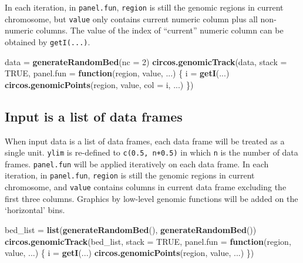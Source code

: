 \documentclass[]{book}
\newenvironment{Shaded}{\begin{snugshade}}{\end{snugshade}}
\newcommand{\KeywordTok}[1]{\textcolor[rgb]{0.13,0.29,0.53}{\textbf{#1}}}
\newcommand{\DataTypeTok}[1]{\textcolor[rgb]{0.13,0.29,0.53}{#1}}
\newcommand{\DecValTok}[1]{\textcolor[rgb]{0.00,0.00,0.81}{#1}}
\newcommand{\StringTok}[1]{\textcolor[rgb]{0.31,0.60,0.02}{#1}}
\newcommand{\OtherTok}[1]{\textcolor[rgb]{0.56,0.35,0.01}{#1}}
\newcommand{\ControlFlowTok}[1]{\textcolor[rgb]{0.13,0.29,0.53}{\textbf{#1}}}
\newcommand{\NormalTok}[1]{#1}
\theoremstyle{definition}
\theoremstyle{definition}
\theoremstyle{remark}
\begin{document}
In each iteration, in \texttt{panel.fun}, \texttt{region} is still the
genomic regions in current chromosome, but \texttt{value} only contains
current numeric column plus all non-numeric columns. The value of the
index of ``current'' numeric column can be obtained by
\texttt{getI(...)}.

\begin{Shaded}
\begin{Highlighting}[]
\NormalTok{data =}\StringTok{ }\KeywordTok{generateRandomBed}\NormalTok{(}\DataTypeTok{nc =} \DecValTok{2}\NormalTok{)}
\KeywordTok{circos.genomicTrack}\NormalTok{(data, }\DataTypeTok{stack =} \OtherTok{TRUE}\NormalTok{,}
    \DataTypeTok{panel.fun =} \ControlFlowTok{function}\NormalTok{(region, value, ...) \{}
\NormalTok{        i =}\StringTok{ }\KeywordTok{getI}\NormalTok{(...)}
        \KeywordTok{circos.genomicPoints}\NormalTok{(region, value, }\DataTypeTok{col =}\NormalTok{ i, ...)}
\NormalTok{\})}
\end{Highlighting}
\end{Shaded}

\subsection{Input is a list of data
frames}\label{input-is-a-list-of-data-frames-1}

When input data is a list of data frames, each data frame will be
treated as a single unit. \texttt{ylim} is re-defined to
\texttt{c(0.5,\ n+0.5)} in which \texttt{n} is the number of data
frames. \texttt{panel.fun} will be applied iteratively on each data
frame. In each iteration, in \texttt{panel.fun}, \texttt{region} is
still the genomic regions in current chromosome, and \texttt{value}
contains columns in current data frame excluding the first three
columns. Graphics by low-level genomic functions will be added on the
`horizontal' bins.

\begin{Shaded}
\begin{Highlighting}[]
\NormalTok{bed_list =}\StringTok{ }\KeywordTok{list}\NormalTok{(}\KeywordTok{generateRandomBed}\NormalTok{(), }\KeywordTok{generateRandomBed}\NormalTok{())}
\KeywordTok{circos.genomicTrack}\NormalTok{(bed_list, }\DataTypeTok{stack =} \OtherTok{TRUE}\NormalTok{,}
    \DataTypeTok{panel.fun =} \ControlFlowTok{function}\NormalTok{(region, value, ...) \{}
\NormalTok{        i =}\StringTok{ }\KeywordTok{getI}\NormalTok{(...)}
        \KeywordTok{circos.genomicPoints}\NormalTok{(region, value, ...)}
\NormalTok{\})}
\end{Highlighting}
\end{Shaded}
\end{document}
